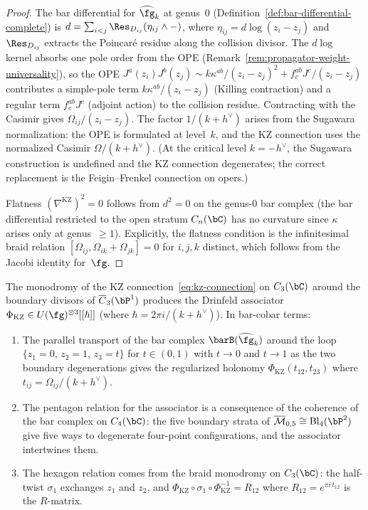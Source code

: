 \begin{proof}
The bar differential for $\widehat{\fg}_k$ at genus~$0$
(Definition~\ref{def:bar-differential-complete}) is
$d = \sum_{i<j} \Res_{D_{ij}} (\eta_{ij} \wedge -)$,
where $\eta_{ij} = d\log(z_i-z_j)$ and $\Res_{D_{ij}}$
extracts the Poincar\'e residue along the collision divisor.
The $d\log$ kernel absorbs one pole order from the OPE
(Remark~\ref{rem:propagator-weight-universality}),
so the OPE $J^a(z_i) J^b(z_j) \sim k\kappa^{ab}/(z_i-z_j)^2
+ f^{ab}_c J^c/(z_i-z_j)$ contributes a simple-pole term
$k\kappa^{ab}/(z_i-z_j)$ (Killing contraction) and a regular
term $f^{ab}_c J^c$ (adjoint action) to the collision residue.
Contracting with the Casimir gives
$\Omega_{ij}/(z_i-z_j)$. The factor $1/(k+h^\vee)$ arises from
the Sugawara normalization: the OPE is formulated at level~$k$,
and the KZ connection uses the normalized Casimir
$\Omega/(k+h^\vee)$. (At the critical level $k = -h^\vee$,
the Sugawara construction is undefined and the KZ connection
degenerates; the correct replacement is the Feigin--Frenkel
connection on opers.)

Flatness $(\nabla^{\mathrm{KZ}})^2 = 0$ follows from $d^2 = 0$
on the genus-$0$ bar complex (the bar differential restricted to
the open stratum $C_n(\bC)$ has no curvature since $\kappa$ arises
only at genus~$\geq 1$). Explicitly, the flatness condition is
the infinitesimal braid relation
$[\Omega_{ij}, \Omega_{ik} + \Omega_{jk}] = 0$ for $i,j,k$ distinct,
which follows from the Jacobi identity for~$\fg$.
\end{proof}

\begin{theorem}
\label{thm:drinfeld-associator-bar}
The monodromy of the KZ connection~\eqref{eq:kz-connection}
on $C_3(\bC)$ around the boundary divisors of
$\overline{C}_3(\bP^1)$ produces the Drinfeld associator
$\Phi_{\mathrm{KZ}} \in U(\fg)^{\otimes 3}[[\hbar]]$
(where $\hbar = 2\pi i/(k+h^\vee)$). In bar-cobar terms:
\begin{enumerate}[label=\textup{(\roman*)}]
\item The parallel transport of the bar complex
 $\barB(\widehat{\fg}_k)$ around the loop
 $\{z_1 = 0,\, z_2 = 1,\, z_3 = t\}$ for $t \in (0,1)$
 with $t \to 0$ and $t \to 1$ as the two boundary degenerations
 gives the regularized holonomy
 $\Phi_{\mathrm{KZ}}(t_{12}, t_{23})$
 where $t_{ij} = \Omega_{ij}/(k+h^\vee)$.
\item The pentagon relation for the associator
 is a consequence of the coherence of the bar complex
 on $C_4(\bC)$: the five boundary strata of
 $\overline{\mathcal{M}}_{0,5} \cong \operatorname{Bl}_4(\bP^2)$
 give five ways to degenerate four-point configurations,
 and the associator intertwines them.
\item The hexagon relation comes from the braid monodromy
 on $C_3(\bC)$: the half-twist $\sigma_1$ exchanges
 $z_1$ and $z_2$, and
 $\Phi_{\mathrm{KZ}} \circ \sigma_1 \circ \Phi_{\mathrm{KZ}}^{-1}
 = R_{12}$
 where $R_{12} = e^{\pi i\, t_{12}}$ is the $R$-matrix.
\end{enumerate}
\end{theorem}

